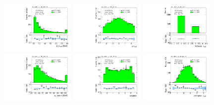 \clearpage

\begin{figure}[tp]
  \centering
  \includegraphics[width=0.32\textwidth]{figures/analysis/vbf-MCXSR/tau-pt}
  \includegraphics[width=0.32\textwidth]{figures/analysis/vbf-MCXSR/tau-eta}
  \includegraphics[width=0.32\textwidth]{figures/analysis/vbf-MCXSR/tau-numTrack} \\
  \includegraphics[width=0.32\textwidth]{figures/analysis/vbf-MCXSR/lep-pt-hi}
  \includegraphics[width=0.32\textwidth]{figures/analysis/vbf-MCXSR/lep-eta}
  \includegraphics[width=0.32\textwidth]{figures/analysis/vbf-MCXSR/taulep-dR} \\

\end{figure}
